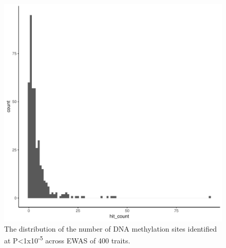 \documentclass[11pt,oneside]{bristolthesis}
\begin{document}
\begin{figure}

{\centering \includegraphics[width=1\linewidth]{figure/05-h2ewas/FOM_hit_count_distribution} 

}

\caption{The distribution of the number of DNA methylation sites identified at P\textless1x10\textsuperscript{-5} across EWAS of 400 traits.}\label{fig:h2ewas-dmp-dist}
\end{figure}
\end{document}
